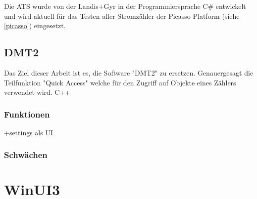 Die \ac{ATS} wurde von der Landis+Gyr in der Programmiersprache C\# entwickelt und wird aktuell für das Testen aller Stromzähler der Picasso Platform (siehe \ref{picasso}) eingesetzt.



\subsection{DMT2}\label{dmt}
Das Ziel dieser Arbeit ist es, die Software "DMT2" zu ersetzen. Genauergesagt die Teilfunktion "Quick Access" welche für den Zugriff auf Objekte eines Zählers verwendet wird.
C++

\subsubsection{Funktionen}
+settings als UI

\subsubsection{Schwächen}

\section{WinUI3}


